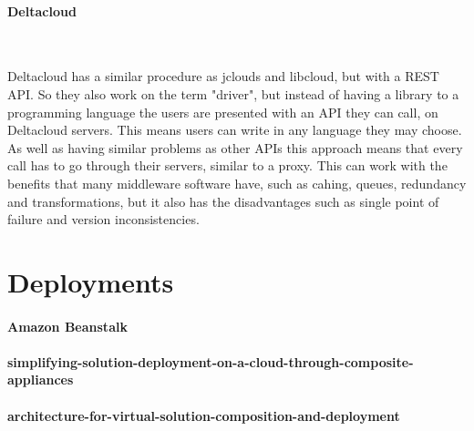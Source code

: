 \paragraph{Deltacloud}~\cite{deltacloud}

Deltacloud has a similar procedure as jclouds and libcloud, but with a REST API. 
So they also work on the term "driver", but instead of having a library to a programming language the users are presented with an API they can call, 
on Deltacloud servers. This means users can write in any language they may choose. 
As well as having similar problems as other APIs this approach means that every call has to go through their servers, 
similar to a proxy. This can work with the benefits that many middleware software have, such as cahing, queues, 
redundancy and transformations, but it also has the disadvantages such as single point of failure and version inconsistencies.

\section{Deployments}

\paragraph{Amazon Beanstalk}
\paragraph{simplifying-solution-deployment-on-a-cloud-through-composite-appliances}
\paragraph{architecture-for-virtual-solution-composition-and-deployment}

